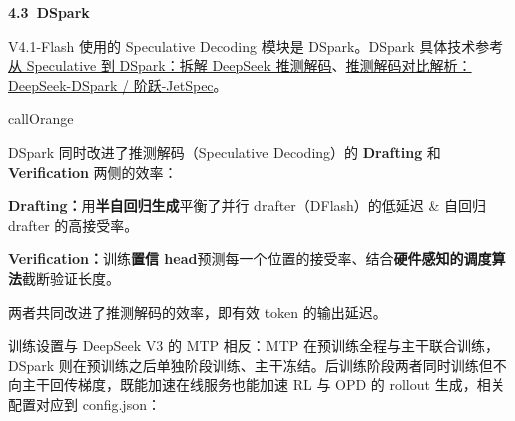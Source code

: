 \documentclass[zihao=false,fontset=windows]{ctexart}
\newcommand{\incode}[1]{\colorbox{inlinebg}{\ttfamily\small #1}}
\begin{document}


\par{}\vspace{0.8em}\noindent \begin{tcolorbox}[boxrule=0pt,arc=3pt,colback=callOrange,left=3pt,right=3pt,top=2pt,bottom=2pt,before skip=0pt,after skip=0pt]{\bfseries \textcolor{feishuBlue}{4.3}\ DSpark}\end{tcolorbox}\par\vspace{0.28em}

V4.1-Flash 使用的 Speculative Decoding 模块是 DSpark。DSpark 具体技术参考 \href{https://my.feishu.cn/wiki/J3Diws4MwiYVT9ksYhLcU6jtnLe}{从 Speculative 到 DSpark：拆解 DeepSeek 推测解码}、\href{https://my.feishu.cn/wiki/KwlAwvEHKilNdXkbaz5cTMagnHe}{推测解码对比解析：DeepSeek-DSpark / 阶跃-JetSpec}。\par

\begin{feishubox}{callOrange}{🌟}

DSpark 同时改进了推测解码（Speculative Decoding）的 \textbf{Drafting} 和 \textbf{Verification} 两侧的效率：\par

\textbf{Drafting：}用\textcolor{feishuRed}{\textbf{\incode{半自回归生成}}}平衡了并行 drafter（DFlash）的低延迟 \& 自回归 drafter 的高接受率。\par

\textbf{Verification：}训练\textcolor{feishuRed}{\textbf{\incode{置信 head}}}预测每一个位置的接受率、结合\textcolor{feishuRed}{\textbf{\incode{硬件感知的调度算法}}}截断验证长度。\par

两者共同改进了推测解码的效率，即有效 token 的输出延迟。\par
\end{feishubox}

训练设置与 DeepSeek V3 的 MTP 相反：MTP 在预训练全程与主干联合训练，DSpark 则在预训练之后单独阶段训练、主干冻结。后训练阶段两者同时训练但不向主干回传梯度，既能加速在线服务也能加速 RL 与 OPD 的 rollout 生成，相关配置对应到 \incode{config.json}：\par
\end{document}
